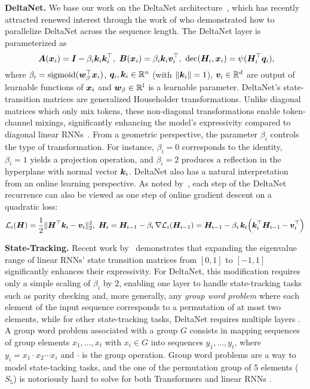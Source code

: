 \documentclass{article} %
\begin{document}
\textbf{DeltaNet.} We base our work on the DeltaNet architecture~\citep{schlag-icml21a,schlag-iclr21a}, which has recently attracted renewed interest through the work of \citet{yang-neurips24a,yang-iclr25a} who demonstrated how to parallelize DeltaNet across the sequence length. The DeltaNet layer is parameterized as
\begin{equation*}
~{\bm{A}}({\bm{x}}_i) = {\bm{I}} -\beta_i {\bm{k}}_i{\bm{k}}_i^\top,~{\bm{B}}({\bm{x}}_i)=\beta_i {\bm{k}}_i{\bm{v}}_i^\top,~\mathrm{dec}({\bm{H}}_i, {\bm{x}}_i)=\psi({\bm{H}}_i^\top{\bm{q}}_i),
\end{equation*}
where $\beta_i=\mathrm{sigmoid}({\bm{w}}_{\beta}^\top {\bm{x}}_i)$, ${\bm{q}}_i, {\bm{k}}_i \in \mathbb{R}^n$ (with $\lVert {\bm{k}}_i\rVert = 1$), $ {\bm{v}}_i \in \mathbb{R}^d$ are output of learnable functions of ${\bm{x}}_i$ and ${\bm{w}}_\beta \in \mathbb{R}^l$ is a learnable parameter.
DeltaNet's state-transition matrices are generalized Householder transformations. Unlike diagonal matrices which only mix tokens, these non-diagonal transformations enable token-channel mixings, significantly enhancing the model's expressivity compared to diagonal linear RNNs~\citep{grazzi-iclr25a, merrill-icml24a, peng2025rwkv7gooseexpressivedynamic}.
From a geometric perspective, the parameter $\beta_i$ controls the type of transformation. For instance, $\beta_i=0$ corresponds to the identity, $\beta_i=1$ yields a projection operation, and $\beta_i=2$ produces a reflection in the hyperplane with normal vector ${\bm{k}}_i$.
DeltaNet also has a natural interpretation from an online learning perspective.  As noted by~\citet{yang-neurips24a,wang2025test,liu-iclr25a}, each step of the DeltaNet recurrence can also be viewed as one step of online gradient descent on a quadratic loss:
\begin{equation}
    \mathcal{L}_i(\mH) = \frac{1}{2}\|\mH^\top\vk_i - \vv_i\|_2^2,~ 
    \mH_i = \mH_{i-1} - \beta_i \,\nabla\mathcal{L}_i(\mH_{i-1})
    = \mH_{i-1} - \beta_i\,\vk_i\Bigl(\vk_i^\top\mH_{i-1} - \vv_i^\top\Bigr) %
    \label{eq:delta_opt}
\end{equation}


\textbf{State-Tracking.} Recent work by~\citet{grazzi-iclr25a} demonstrates that expanding the eigenvalue range of linear RNNs' state transition matrices from $[0,1]$ to $[-1,1]$ significantly enhances their expressivity. For DeltaNet, this modification requires only a simple scaling of $\beta_i$ by 2, enabling one layer to handle state-tracking tasks such as parity checking and, more generally, any \textit{group word problem} where each element of the input sequence corresponds to a permutation of at most two elements, while for other state-tracking tasks, DeltaNet requires multiple layers \citep[Theorem 2 and 6]{grazzi-iclr25a}. A group word problem associated with a group $G$ consists in mapping sequences of group elements $x_1,\dots, x_t$ with $x_i \in G$ into sequences $y_1,\dots, y_t$, where $y_i = x_1 \cdot x_2 \cdots x_i$ and $\cdot$ is the group operation. Group word problems are a way to model state-tacking tasks, and the one of the permutation group of 5 elements ($S_5$) is notoriously hard to solve for both Transformers and linear RNNs \citep{liu-iclr23a,merrill2023parallelism,merrill-icml24a}.
\end{document}
